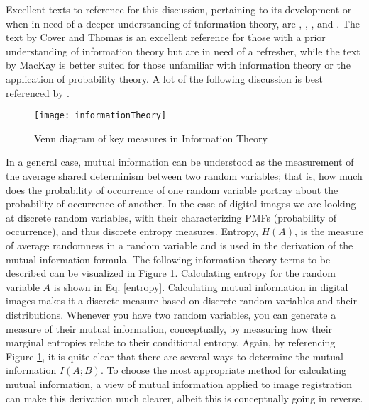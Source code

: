 %
%
%
%
%
%
%
%
%

%
%
%



Excellent texts to reference for this discussion, pertaining to its development or when in need of a deeper understanding of tnformation theory, are \cite{Reza1994}, \cite{MacKay2004}, \cite{Kullback1997}, and \cite{Cover2006}. The text by Cover and Thomas \cite{Cover2006} is an excellent reference for those with a prior understanding of information theory but are in need of a refresher, while the text by MacKay \cite{MacKay2004} is better suited for those unfamiliar with information theory or the application of probability theory. A lot of the following discussion is best referenced by \cite{Cover2006}.

\begin{figure}[h]
\centering
\texttt{[image: informationTheory]}
\caption{Venn diagram of key measures in Information Theory}
\label{informationTheory}
\end{figure}

In a general case, mutual information can be understood as the measurement of the average shared determinism between two random variables; that is, how much does the probability of occurrence of one random variable portray about the probability of occurrence of another. In the case of digital images we are looking at discrete random variables, with their characterizing PMFs (probability of occurrence), and thus discrete entropy measures. Entropy, $H(A)$, is the measure of average randomness in a random variable and is used in the derivation of the mutual information formula. The following information theory terms to be described can be visualized in Figure \ref{informationTheory}. Calculating entropy for the random variable $A$ is shown in Eq. \ref{entropy}. Calculating mutual information in digital images makes it a discrete measure based on discrete random variables and their distributions. Whenever you have two random variables, you can generate a measure of their mutual information, conceptually, by measuring how their marginal entropies relate to their conditional entropy. Again, by referencing Figure \ref{informationTheory}, it is quite clear that there are several ways to determine the mutual information $I(A;B)$. To choose the most appropriate method for calculating mutual information, a view of mutual information applied to image registration can make this derivation much clearer, albeit this is conceptually going in reverse.

